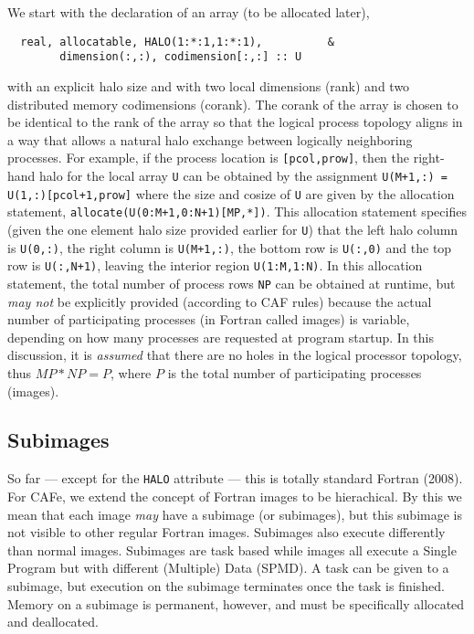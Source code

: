 We start with the declaration of an array (to be allocated later),
\begin{verbatim}
  real, allocatable, HALO(1:*:1,1:*:1),          &
        dimension(:,:), codimension[:,:] :: U
\end{verbatim}
with an explicit halo size and with two local dimensions (rank) and
two distributed memory codimensions (corank).  The corank of the array
is chosen to be identical to the rank of the array so that the logical
process topology aligns in a way that allows a natural halo exchange
between logically neighboring processes.  For example, if the process
location is \texttt{[pcol,prow]}, then the right-hand halo for the
local array \texttt{U} can be obtained by the assignment
\texttt{U(M+1,:) = U(1,:)[pcol+1,prow]} where the size and cosize of
\texttt{U} are given by the allocation statement,
\texttt{allocate(U(0:M+1,0:N+1)[MP,*])}.
This allocation statement specifies (given the one element halo size
provided earlier for \texttt{U}) that the left halo column is
\texttt{U(0,:)}, the right column is \texttt{U(M+1,:)}, the bottom row
is \texttt{U(:,0)} and the top row is \texttt{U(:,N+1)}, leaving the
interior region \texttt{U(1:M,1:N)}.  In this allocation statement,
the total number of process rows \texttt{NP} can be obtained at
runtime, but \emph{may not} be explicitly provided (according to CAF
rules) because the actual number of participating processes (in
Fortran called images) is variable, depending on how many processes
are requested at program startup.  In this discussion, it is
\emph{assumed} that there are no holes in the logical processor
topology, thus $MP*NP = P$, where $P$ is the total number of
participating processes (images).

\subsection{Subimages}

So far --- except for the \texttt{HALO} attribute --- this is totally
standard Fortran (2008).  For CAFe, we extend the concept of Fortran
images to be hierachical.  By this we mean that each image \emph{may}
have a subimage (or subimages), but this subimage is not visible to
other regular Fortran images.  Subimages also execute differently than
normal images.  Subimages are task based while images all execute a
Single Program but with different (Multiple) Data (SPMD).  A task can
be given to a subimage, but execution on the subimage terminates once
the task is finished.  Memory on a subimage is permanent, however, and
must be specifically allocated and deallocated.

